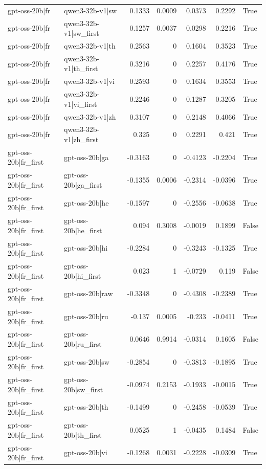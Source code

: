 \begin{table}
\begin{tabular}{l l r r r r l}
gpt-oss-20b|fr & qwen3-32b-v1|sw & 0.1333 & 0.0009 & 0.0373 & 0.2292 & True \\
gpt-oss-20b|fr & qwen3-32b-v1|sw_first & 0.1257 & 0.0037 & 0.0298 & 0.2216 & True \\
gpt-oss-20b|fr & qwen3-32b-v1|th & 0.2563 & 0 & 0.1604 & 0.3523 & True \\
gpt-oss-20b|fr & qwen3-32b-v1|th_first & 0.3216 & 0 & 0.2257 & 0.4176 & True \\
gpt-oss-20b|fr & qwen3-32b-v1|vi & 0.2593 & 0 & 0.1634 & 0.3553 & True \\
gpt-oss-20b|fr & qwen3-32b-v1|vi_first & 0.2246 & 0 & 0.1287 & 0.3205 & True \\
gpt-oss-20b|fr & qwen3-32b-v1|zh & 0.3107 & 0 & 0.2148 & 0.4066 & True \\
gpt-oss-20b|fr & qwen3-32b-v1|zh_first & 0.325 & 0 & 0.2291 & 0.421 & True \\
gpt-oss-20b|fr_first & gpt-oss-20b|ga & -0.3163 & 0 & -0.4123 & -0.2204 & True \\
gpt-oss-20b|fr_first & gpt-oss-20b|ga_first & -0.1355 & 0.0006 & -0.2314 & -0.0396 & True \\
gpt-oss-20b|fr_first & gpt-oss-20b|he & -0.1597 & 0 & -0.2556 & -0.0638 & True \\
gpt-oss-20b|fr_first & gpt-oss-20b|he_first & 0.094 & 0.3008 & -0.0019 & 0.1899 & False \\
gpt-oss-20b|fr_first & gpt-oss-20b|hi & -0.2284 & 0 & -0.3243 & -0.1325 & True \\
gpt-oss-20b|fr_first & gpt-oss-20b|hi_first & 0.023 & 1 & -0.0729 & 0.119 & False \\
gpt-oss-20b|fr_first & gpt-oss-20b|raw & -0.3348 & 0 & -0.4308 & -0.2389 & True \\
gpt-oss-20b|fr_first & gpt-oss-20b|ru & -0.137 & 0.0005 & -0.233 & -0.0411 & True \\
gpt-oss-20b|fr_first & gpt-oss-20b|ru_first & 0.0646 & 0.9914 & -0.0314 & 0.1605 & False \\
gpt-oss-20b|fr_first & gpt-oss-20b|sw & -0.2854 & 0 & -0.3813 & -0.1895 & True \\
gpt-oss-20b|fr_first & gpt-oss-20b|sw_first & -0.0974 & 0.2153 & -0.1933 & -0.0015 & True \\
gpt-oss-20b|fr_first & gpt-oss-20b|th & -0.1499 & 0 & -0.2458 & -0.0539 & True \\
gpt-oss-20b|fr_first & gpt-oss-20b|th_first & 0.0525 & 1 & -0.0435 & 0.1484 & False \\
gpt-oss-20b|fr_first & gpt-oss-20b|vi & -0.1268 & 0.0031 & -0.2228 & -0.0309 & True \\

\end{tabular}
\end{table}
